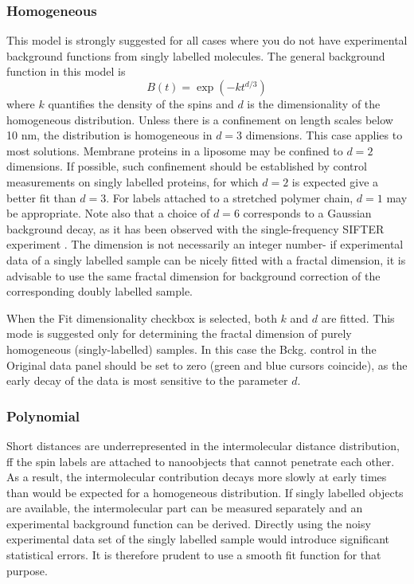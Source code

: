 \documentclass{article}
\begin{document}
\subsubsection{Homogeneous}
This model is strongly suggested for all cases where you do not have experimental background functions from singly labelled molecules. The general background function in this model is
\begin{equation}
	B \left( t \right) = \exp \left( -k t^{d/3} \right) 
\end{equation}
where $k$ quantifies the density of the spins and $d$ is the dimensionality of the homogeneous distribution. Unless there is a confinement on length scales below 10 nm, the distribution is homogeneous in $d=3$ dimensions. This case applies to most solutions. Membrane proteins in a liposome may be confined to $d=2$ dimensions. If possible, such confinement should be established by control measurements on singly labelled proteins, for which $d=2$ is expected give a better fit than $d=3$. For labels attached to a stretched polymer chain, $d=1$ may be appropriate. Note also that a choice of $d=6$ corresponds to a Gaussian background decay, as it has been observed with the single-frequency SIFTER experiment \cite{sifter}. The dimension is not necessarily an integer number- if experimental data of a singly labelled sample can be nicely fitted with a fractal dimension, it is advisable to use the same fractal dimension for background correction of the corresponding doubly labelled sample.

When the {\ttfamily Fit dimensionality} checkbox is selected, both $k$ and $d$ are fitted. This mode is suggested only for determining the fractal dimension of purely homogeneous (singly-labelled) samples. In this case the {\ttfamily Bckg.} control in the {\ttfamily Original data} panel should be set to zero (green and blue cursors coincide), as the early decay of the data is most sensitive to the parameter $d$.   

\subsubsection{Polynomial}
Short distances are underrepresented in the intermolecular distance distribution, ff the spin labels are attached to nanoobjects that cannot penetrate each other. As a result, the intermolecular contribution decays more slowly at early times than would be expected for a homogeneous distribution. If singly labelled objects are available, the intermolecular part can be measured separately and an experimental background function can be derived. Directly using the noisy experimental data set of the singly labelled sample would introduce significant statistical errors. It is therefore prudent to use a smooth fit function for that purpose.
\end{document}
